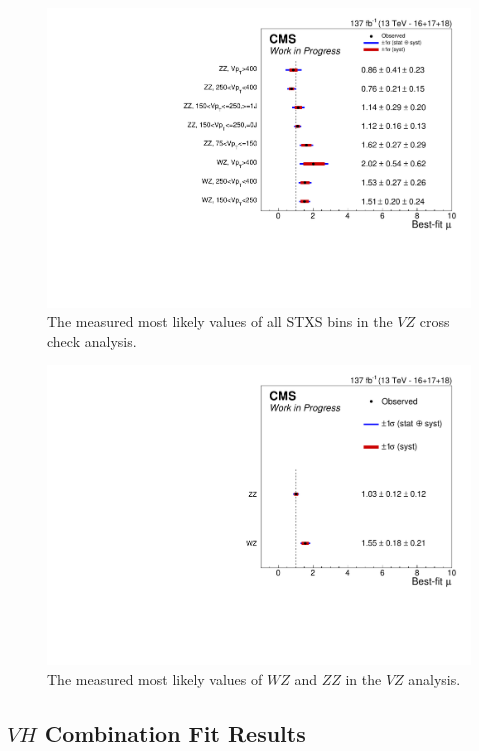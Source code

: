 \begin{figure}
  \centering
  \includegraphics[width=0.8\linewidth]{figures/210308_STXS_VZ_unblinded_XbbVZ_e4179c95_a866aef8/summary_stxs.pdf}
  \caption[Measured STXS values of $V\!Z$]{
    The measured most likely values of all STXS bins in the
    $V\!Z$ cross check analysis.
  }
  \label{fig:vz-stxs}
\end{figure}

\begin{figure}
  \centering
  \includegraphics[width=0.8\linewidth]{figures/210404_VZ_unblinded_XbbVZ_df06b22d_a866aef8/summary_stxs.pdf}
  \caption[Measured values of $W\!Z$ and $Z\!Z$]{
    The measured most likely values of $W\!Z$ and $Z\!Z$ in the
    $V\!Z$ analysis.
  }
  \label{fig:vz-wzzz}
\end{figure}

\subsection{$V\!H$ Combination Fit Results}

